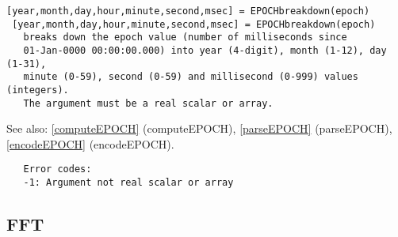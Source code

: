 \documentclass[a4paper]{article}
\begin{document}
\begin{tscreen}
\begin{verbatim}
[year,month,day,hour,minute,second,msec] = EPOCHbreakdown(epoch)
 [year,month,day,hour,minute,second,msec] = EPOCHbreakdown(epoch)
   breaks down the epoch value (number of milliseconds since
   01-Jan-0000 00:00:00.000) into year (4-digit), month (1-12), day (1-31),
   minute (0-59), second (0-59) and millisecond (0-999) values (integers).
   The argument must be a real scalar or array.
\end{verbatim}

See also: \ref{computeEPOCH} {(computeEPOCH)}, \ref{parseEPOCH} {(parseEPOCH)}, \ref{encodeEPOCH} {(encodeEPOCH)}.
\begin{verbatim}
   Error codes:
   -1: Argument not real scalar or array
\end{verbatim}
\end{tscreen}





\subsection{FFT\label{FFT}}
\end{document}
